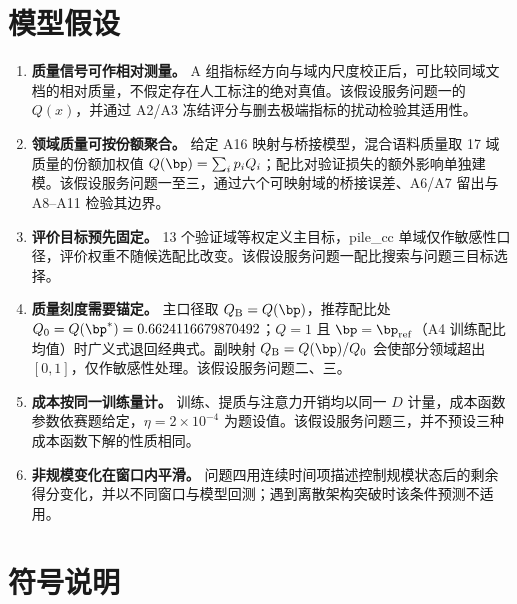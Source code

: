 \section{模型假设}
\label{sec:3}

\begin{enumerate}
\item \textbf{质量信号可作相对测量。} A 组指标经方向与域内尺度校正后，可比较同域文档的相对质量，不假定存在人工标注的绝对真值。该假设服务问题一的 $Q(x)$，并通过 A2/A3 冻结评分与删去极端指标的扰动检验其适用性。
\item \textbf{领域质量可按份额聚合。} 给定 A16 映射与桥接模型，混合语料质量取 17 域质量的份额加权值 $Q(\bp)=\sum_i p_iQ_i$；配比对验证损失的额外影响单独建模。该假设服务问题一至三，通过六个可映射域的桥接误差、A6/A7 留出与 A8–A11 检验其边界。
\item \textbf{评价目标预先固定。} 13 个验证域等权定义主目标，pile\_cc 单域仅作敏感性口径，评价权重不随候选配比改变。该假设服务问题一配比搜索与问题三目标选择。
\item \textbf{质量刻度需要锚定。} 主口径取 $Q_{\rm B}=Q(\bp)$，推荐配比处 $Q_0=Q(\bp^*)=0.6624116679870492$；$Q=1$ 且 $\bp=\bp_{\rm ref}$（A4 训练配比均值）时广义式退回经典式。副映射 $Q_{\rm B}=Q(\bp)/Q_0$ 会使部分领域超出 $[0,1]$，仅作敏感性处理。该假设服务问题二、三。
\item \textbf{成本按同一训练量计。} 训练、提质与注意力开销均以同一 $D$ 计量，成本函数参数依赛题给定，$\eta=2\times10^{-4}$ 为题设值。该假设服务问题三，并不预设三种成本函数下解的性质相同。
\item \textbf{非规模变化在窗口内平滑。} 问题四用连续时间项描述控制规模状态后的剩余得分变化，并以不同窗口与模型回测；遇到离散架构突破时该条件预测不适用。
\end{enumerate}

\section{符号说明}
\label{sec:4}

